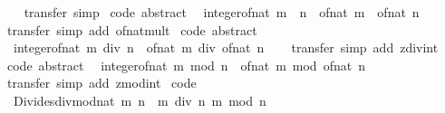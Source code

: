 \begin{isabellebody}
%
\isadelimproof
\ \ %
\endisadelimproof
%
\isatagproof
{}\isamarkupfalse%
\ transfer\ simp%
\endisatagproof
{\isafoldproof}%
%
\isadelimproof
\isanewline
%
\endisadelimproof
\isanewline
{}\isamarkupfalse%
\ {\isacharbrackleft}code\ abstract{\isacharbrackright}{\isacharcolon}\isanewline
\ \ {\isachardoublequoteopen}integer{\isacharunderscore}of{\isacharunderscore}nat\ {\isacharparenleft}m\ {\isacharasterisk}\ n{\isacharparenright}\ {\isacharequal}\ of{\isacharunderscore}nat\ m\ {\isacharasterisk}\ of{\isacharunderscore}nat\ n{\isachardoublequoteclose}\isanewline
%
\isadelimproof
\ \ %
\endisadelimproof
%
\isatagproof
{}\isamarkupfalse%
\ transfer\ {\isacharparenleft}simp\ add{\isacharcolon}\ of{\isacharunderscore}nat{\isacharunderscore}mult{\isacharparenright}%
\endisatagproof
{\isafoldproof}%
%
\isadelimproof
\isanewline
%
\endisadelimproof
\isanewline
{}\isamarkupfalse%
\ {\isacharbrackleft}code\ abstract{\isacharbrackright}{\isacharcolon}\isanewline
\ \ {\isachardoublequoteopen}integer{\isacharunderscore}of{\isacharunderscore}nat\ {\isacharparenleft}m\ div\ n{\isacharparenright}\ {\isacharequal}\ of{\isacharunderscore}nat\ m\ div\ of{\isacharunderscore}nat\ n{\isachardoublequoteclose}\isanewline
%
\isadelimproof
\ \ %
\endisadelimproof
%
\isatagproof
{}\isamarkupfalse%
\ transfer\ {\isacharparenleft}simp\ add{\isacharcolon}\ zdiv{\isacharunderscore}int{\isacharparenright}%
\endisatagproof
{\isafoldproof}%
%
\isadelimproof
\isanewline
%
\endisadelimproof
\isanewline
{}\isamarkupfalse%
\ {\isacharbrackleft}code\ abstract{\isacharbrackright}{\isacharcolon}\isanewline
\ \ {\isachardoublequoteopen}integer{\isacharunderscore}of{\isacharunderscore}nat\ {\isacharparenleft}m\ mod\ n{\isacharparenright}\ {\isacharequal}\ of{\isacharunderscore}nat\ m\ mod\ of{\isacharunderscore}nat\ n{\isachardoublequoteclose}\isanewline
%
\isadelimproof
\ \ %
\endisadelimproof
%
\isatagproof
{}\isamarkupfalse%
\ transfer\ {\isacharparenleft}simp\ add{\isacharcolon}\ zmod{\isacharunderscore}int{\isacharparenright}%
\endisatagproof
{\isafoldproof}%
%
\isadelimproof
\isanewline
%
\endisadelimproof
\isanewline
{}\isamarkupfalse%
\ {\isacharbrackleft}code{\isacharbrackright}{\isacharcolon}\isanewline
\ \ {\isachardoublequoteopen}Divides{\isachardot}divmod{\isacharunderscore}nat\ m\ n\ {\isacharequal}\ {\isacharparenleft}m\ div\ n{\isacharcomma}\ m\ mod\ n{\isacharparenright}{\isachardoublequoteclose}\isanewline
%
\isadelimproof
\ \ %
\endisadelimproof
%
\isatagproof
{}\isamarkupfalse%

\end{isabellebody}
